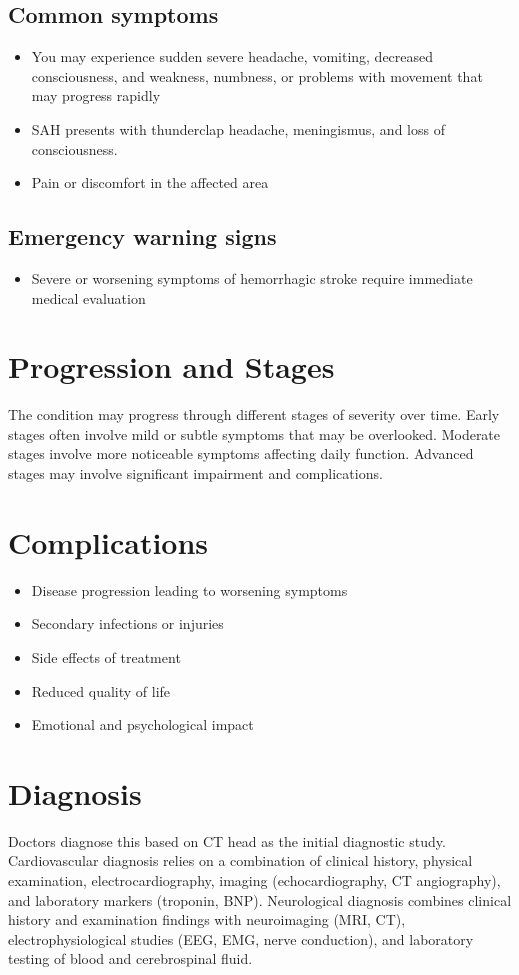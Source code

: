 \subsection{Common symptoms}
\begin{itemize}[noitemsep]
  \item You may experience sudden severe headache, vomiting, decreased consciousness, and weakness, numbness, or problems with movement that may progress rapidly
  \item SAH presents with thunderclap headache, meningismus, and loss of consciousness.
  \item Pain or discomfort in the affected area
  \end{itemize}
\subsection{Emergency warning signs}
\begin{itemize}[noitemsep]
  \item Severe or worsening symptoms of hemorrhagic stroke require immediate medical evaluation
\end{itemize}
\section{Progression and Stages}
The condition may progress through different stages of severity over time. Early stages often involve mild or subtle symptoms that may be overlooked. Moderate stages involve more noticeable symptoms affecting daily function. Advanced stages may involve significant impairment and complications.
\section{Complications}
\begin{itemize}[noitemsep]
  \item Disease progression leading to worsening symptoms
  \item Secondary infections or injuries
  \item Side effects of treatment
  \item Reduced quality of life
  \item Emotional and psychological impact
\end{itemize}
\section{Diagnosis}
Doctors diagnose this based on CT head as the initial diagnostic study. Cardiovascular diagnosis relies on a combination of clinical history, physical examination, electrocardiography, imaging (echocardiography, CT angiography), and laboratory markers (troponin, BNP). Neurological diagnosis combines clinical history and examination findings with neuroimaging (MRI, CT), electrophysiological studies (EEG, EMG, nerve conduction), and laboratory testing of blood and cerebrospinal fluid.

